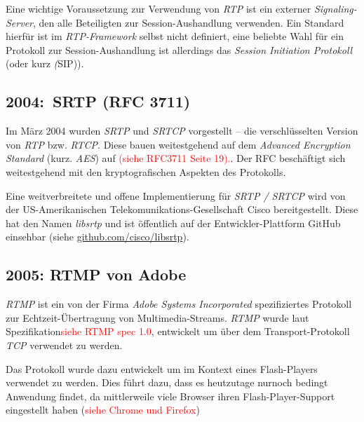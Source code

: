 \documentclass{IEEEtran}
\begin{document}
\begin{twocolumn}
Eine wichtige Voraussetzung zur Verwendung von \textit{RTP} ist ein externer
\textit{Signaling-Server}, den alle Beteiligten zur Session-Aushandlung
verwenden. Ein Standard hierfür ist im \textit{RTP-Framework} selbst nicht
definiert, eine beliebte Wahl für ein Protokoll zur Session-Aushandlung ist
allerdings das \textit{Session Initiation Protokoll} (oder kurz \textit(SIP)).

\subsection{2004:\ SRTP (RFC 3711)}

Im März 2004 wurden \textit{SRTP} und \textit{SRTCP} vorgestellt – die
verschlüsselten Version von \textit{RTP} bzw. \textit{RTCP}. Diese bauen
weitestgehend auf dem \textit{Advanced Encryption Standard} (kurz.
\textit{AES}) auf \textcolor{red}{(siehe RFC3711 Seite 19).}. Der RFC
beschäftigt sich weitestgehend mit den kryptografischen Aspekten des
Protokolls.

Eine weitverbreitete und offene Implementierung für \textit{SRTP / SRTCP}
wird von der US-Amerikanischen Telekomunikations-Gesellschaft Cisco
bereitgestellt. Diese hat den Namen \textit{libsrtp} und ist öffentlich auf der
Entwickler-Plattform GitHub einsehbar (siehe
\href{https://github.com/cisco/libsrtp}{github.com/cisco/libsrtp}).


\subsection{2005: RTMP von Adobe}

\textit{RTMP} ist ein von der Firma \textit{Adobe Systems Incorporated}
spezifiziertes Protokoll zur Echtzeit-Übertragung von Multimedia-Streams.
\textit{RTMP} wurde laut Spezifikation\textcolor{red}{siehe RTMP spec 1.0},
entwickelt um über dem Transport-Protokoll \textit{TCP} verwendet zu werden.

Das Protokoll wurde dazu entwickelt um im Kontext eines Flash-Players verwendet
zu werden. Dies führt dazu, dass es heutzutage nurnoch bedingt Anwendung
findet, da mittlerweile viele Browser ihren Flash-Player-Support eingestellt
haben (\textcolor{red}{siehe Chrome und Firefox}) %


\end{twocolumn}
\end{document}
